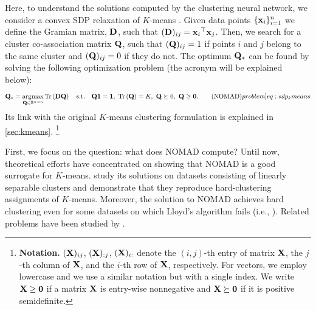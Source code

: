 \documentclass[twoside,11pt]{article}
\begin{document}
Here, to understand the solutions computed by the clustering neural network, we consider a convex SDP relaxation of  $K$-means  \citep{Kulis2007,Peng2007_sdk-kmeans,Awasthi2015}. Given data points $\{ {\mathbf{x}}_i \}_{i=1}^{n}$ we define the Gramian matrix, ${\mathbf{D}}$, such that $({\mathbf{D}})_{ij} =  {{\mathbf{x}}_i}^\top {\mathbf{x}}_j$. Then, we search for a cluster co-association matrix ${\mathbf{Q}}$, such that $({\mathbf{Q}})_{ij} = 1$ if points $i$ and $j$ belong to the same cluster and  $({\mathbf{Q}})_{ij} = 0$ if they do not. The optimum ${\mathbf{Q}}_*$ can be found by solving the following optimization problem (the acronym will be explained below): 
\begin{equation}
	\mat{Q}_* = \argmax_{\mat{Q} \in \Real^{n \times n}}
	\traceone{\mat{D} \mat{Q}}
	\quad\text{s.t.}\quad
	\mat{Q} \vect{1} = \vect{1} ,\
	\traceone{\mat{Q}} = K ,\
	\mat{Q} \succeq 0 ,\
	\mat{Q} \geq \mat{0} .
	\tag{NOMAD}
	\label[problem]{eq:sdp_kmeans}
\end{equation}
Its link with the original $K$-means clustering formulation is explained in \cref{sec:kmeans}.%
%
\footnote{
\noindent\textbf{Notation.}
$({\mathbf{X}})_{ij}$, $({\mathbf{X}})_{:j}$, $({\mathbf{X}})_{i:}$ denote the $(i,j)$-th entry of matrix ${\mathbf{X}}$, the $j$-th column of ${\mathbf{X}}$, and the $i$-th row of ${\mathbf{X}}$, respectively. For vectors, we employ lowercase and we use a similar notation but with a single index.
We write ${\mathbf{X}} \geq {\mathbf{0}}$ if a matrix ${\mathbf{X}}$ is entry-wise nonnegative and ${\mathbf{X}} \succeq {\mathbf{0}}$ if it is positive semidefinite.
}
%

First, we focus on the question: what does NOMAD compute?
Until now, theoretical efforts have concentrated on showing that NOMAD is a good surrogate for $K$-means. \citet{Awasthi2015} study its solutions on datasets consisting of linearly separable clusters and demonstrate that they reproduce hard-clustering assignments of $K$-means. Moreover, the solution to NOMAD achieves hard clustering even for some datasets on which Lloyd's algorithm \citep{Lloyd1982} fails (i.e., \citet{Iguchi2015,Mixon2016}).
Related problems have been studied by \citet{Amini2014,Javanmard2016,Yu2012regularizers}.
\end{document}
